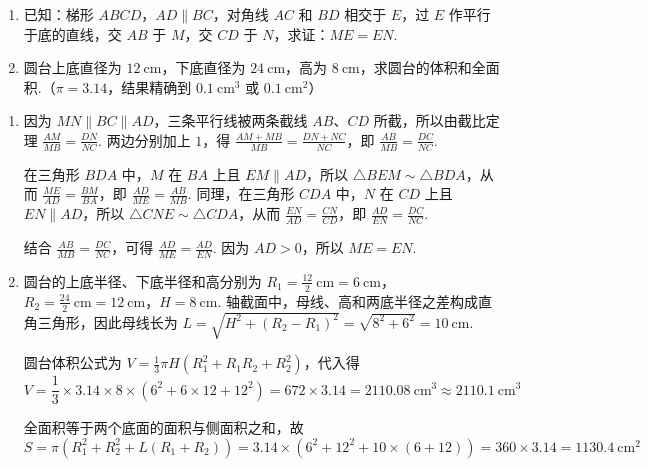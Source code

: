 \begin{problem}
\begin{enumerate}
\item 已知：梯形 \(ABCD\)，\(AD\parallel BC\)，对角线 \(AC\) 和 \(BD\) 相交于 \(E\)，过 \(E\) 作平行于底的直线，交 \(AB\) 于 \(M\)，交 \(CD\) 于 \(N\)，求证：\(ME=EN\).
\item 圆台上底直径为 \(12\mathrm{~cm}\)，下底直径为 \(24\mathrm{~cm}\)，高为 \(8\mathrm{~cm}\)，求圆台的体积和全面积.（\(\pi=3.14\)，结果精确到 \(0.1\mathrm{~cm}^3\) 或 \(0.1\mathrm{~cm}^2\)）
\end{enumerate}
\end{problem}

\begin{solution}
\begin{enumerate}
\item 因为 \(MN\parallel BC\parallel AD\)，三条平行线被两条截线 \(AB\)、\(CD\) 所截，所以由截比定理
\(\frac{AM}{MB}=\frac{DN}{NC}\). 两边分别加上 \(1\)，得
\(\frac{AM+MB}{MB}=\frac{DN+NC}{NC}\)，即
\(\frac{AB}{MB}=\frac{DC}{NC}\).

在三角形 \(BDA\) 中，\(M\) 在 \(BA\) 上且 \(EM\parallel AD\)，所以 \(\triangle BEM\sim\triangle BDA\)，从而
\(\frac{ME}{AD}=\frac{BM}{BA}\)，即 \(\frac{AD}{ME}=\frac{AB}{MB}\). 同理，在三角形 \(CDA\) 中，\(N\) 在 \(CD\) 上且 \(EN\parallel AD\)，所以 \(\triangle CNE\sim\triangle CDA\)，从而
\(\frac{EN}{AD}=\frac{CN}{CD}\)，即 \(\frac{AD}{EN}=\frac{DC}{NC}\).

结合 \(\frac{AB}{MB}=\frac{DC}{NC}\)，可得 \(\frac{AD}{ME}=\frac{AD}{EN}\). 因为 \(AD>0\)，所以 \(ME=EN\).


\item 圆台的上底半径、下底半径和高分别为
\(R_1=\frac{12}{2}\mathrm{~cm}=6\mathrm{~cm}\)，\(R_2=\frac{24}{2}\mathrm{~cm}=12\mathrm{~cm}\)，\(H=8\mathrm{~cm}\). 轴截面中，母线、高和两底半径之差构成直角三角形，因此母线长为
\(L=\sqrt{H^2+\left(R_2-R_1\right)^2}=\sqrt{8^2+6^2}=10\mathrm{~cm}\).

圆台体积公式为 \(V=\frac{1}{3}\pi H\left(R_1^2+R_1R_2+R_2^2\right)\)，代入得
\[
V=\frac{1}{3}\times3.14\times8\times\left(6^2+6\times12+12^2\right)
=672\times3.14=2110.08\mathrm{~cm}^3\approx2110.1\mathrm{~cm}^3
\]

全面积等于两个底面的面积与侧面积之和，故
\[
S=\pi\left(R_1^2+R_2^2+L\left(R_1+R_2\right)\right)
=3.14\times\left(6^2+12^2+10\times(6+12)\right)
=360\times3.14=1130.4\mathrm{~cm}^2
\]
\end{enumerate}
\end{solution}

